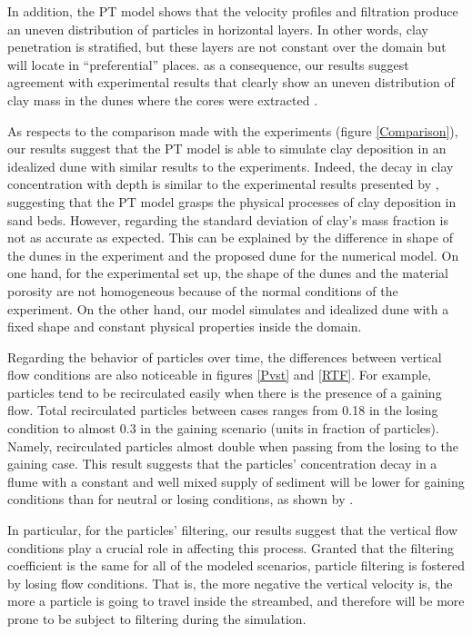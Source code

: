 \documentclass[draft,linenumbers]{agujournal2018}
\begin{document}
In addition, the PT model shows that the velocity profiles and filtration produce an uneven distribution of particles in horizontal layers. In other words, clay penetration is stratified, but these layers are not constant over the domain but will locate in ``preferential'' places. as a consequence, our results suggest agreement with experimental results that clearly show an uneven distribution of clay mass in the dunes where the cores were extracted \citep{Fox2018}.

As respects to the comparison made with the experiments (figure \ref{Comparison}), our results suggest that the PT model is able to simulate clay deposition in an idealized dune with similar results to the experiments. Indeed, the decay in clay concentration with depth is similar to the experimental results presented by \citet{Fox2018}, suggesting that the PT model grasps the physical processes of clay deposition in sand beds. However, regarding the standard deviation of clay's mass fraction is not as accurate as expected. This can be explained by the difference in shape of the dunes in the experiment and the proposed dune for the numerical model. On one hand, for the experimental set up, the shape of the dunes and the material porosity are not homogeneous because of the normal conditions of the experiment. On the other hand, our model simulates and idealized dune with a fixed shape and constant physical properties inside the domain.   

Regarding the behavior of particles over time, the differences between vertical flow conditions are also noticeable in figures \ref{Pvst} and \ref{RTF}. For example, particles tend to be recirculated easily when there is the presence of a gaining flow. Total recirculated particles between cases ranges from 0.18 in the losing condition to almost 0.3 in the gaining scenario (units in fraction of particles). Namely, recirculated particles almost double when passing from the losing to the gaining case. This result suggests that the particles' concentration decay in a flume with a constant and well mixed supply of sediment will be lower for gaining conditions than for neutral or losing conditions, as shown by \citet{Fox2018}.

In particular, for the particles' filtering, our results suggest that the vertical flow conditions play a crucial role in affecting this process. Granted that the filtering coefficient is the same for all of the modeled scenarios, particle filtering is fostered by losing flow conditions. That is, the more negative the vertical velocity is, the more a particle is going to travel inside the streambed, and therefore will be more prone to be subject to filtering during the simulation. 
\end{document}
